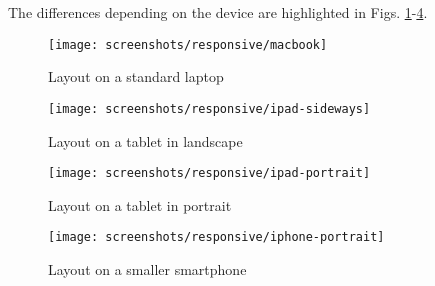 The differences depending on the device are highlighted in Figs. \ref{fig:responsive-macbook}-\ref{fig:responsive-iphone}.

\begin{figure}[h]
    \centering
    \texttt{[image: screenshots/responsive/macbook]}
    \caption{Layout on a standard laptop}
    \label{fig:responsive-macbook}
\end{figure}

\begin{figure}[h]
    \centering
    \texttt{[image: screenshots/responsive/ipad-sideways]}
    \caption{Layout on a tablet in landscape}
    \label{fig:responsive-ipad}
\end{figure}

\begin{figure}[h]
    \centering
    \texttt{[image: screenshots/responsive/ipad-portrait]}
    \caption{Layout on a tablet in portrait}
    \label{fig:responsive-ipad2}
\end{figure}

\begin{figure}[h]
    \centering
    \texttt{[image: screenshots/responsive/iphone-portrait]}
    \caption{Layout on a smaller smartphone}
    \label{fig:responsive-iphone}
\end{figure}




